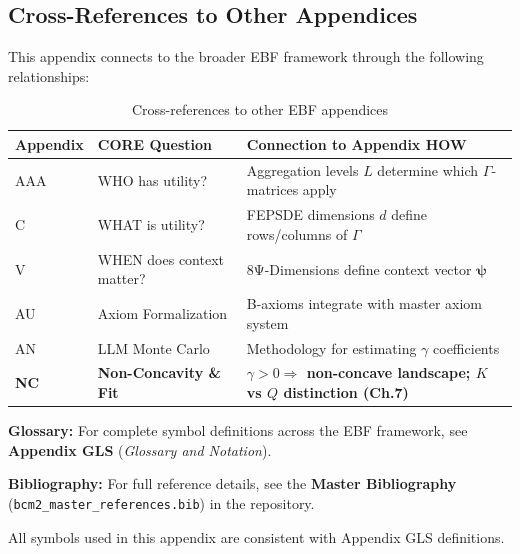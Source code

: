 \subsection{Cross-References to Other Appendices}
\label{sec:B-crossref}

This appendix connects to the broader EBF framework through the following 
relationships:

\begin{table}[h]
\centering
\small
\begin{tabular}{p{2.5cm}p{3cm}p{7cm}}
\toprule
\textbf{Appendix} & \textbf{CORE Question} & \textbf{Connection to Appendix HOW} \\
\midrule
AAA & WHO has utility? & Aggregation levels $L$ determine which $\Gamma$-matrices apply \\
C & WHAT is utility? & FEPSDE dimensions $d$ define rows/columns of $\Gamma$ \\
V & WHEN does context matter? & 8Ψ-Dimensions define context vector $\boldsymbol{\psi}$ \\
AU & Axiom Formalization & B-axioms integrate with master axiom system \\
AN & LLM Monte Carlo & Methodology for estimating $\gamma$ coefficients \\
\textbf{NC} & \textbf{Non-Concavity \& Fit} & \textbf{$\gamma > 0 \Rightarrow$ non-concave landscape; $K$ vs $Q$ distinction (Ch.7)} \\
\bottomrule
\end{tabular}
\caption{Cross-references to other EBF appendices}
\label{tab:crossref}
\end{table}





\begin{tcolorbox}[colback=blue!5!white, colframe=blue!75!black, 
    title=\textbf{Central References}]

\textbf{Glossary:} For complete symbol definitions across the EBF framework, 
see \textbf{Appendix GLS} (\textit{Glossary and Notation}).

\textbf{Bibliography:} For full reference details, see the 
\textbf{Master Bibliography} (\texttt{bcm2\_master\_references.bib}) 
in the repository.

All symbols used in this appendix are consistent with Appendix GLS definitions.

\end{tcolorbox}

